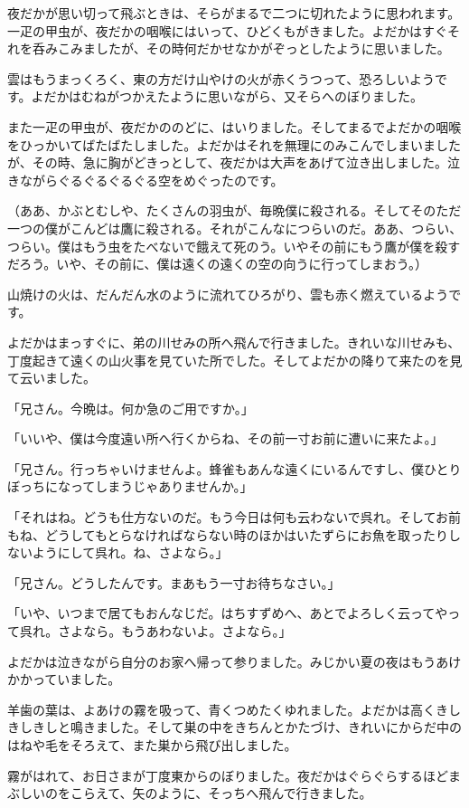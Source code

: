 \documentclass[a4paper, platex, dvipdfmx]{jsarticle}
\begin{document}
夜だかが思い切って飛ぶときは、そらがまるで二つに切れたように思われます。一疋の甲虫が、夜だかの咽喉にはいって、ひどくもがきました。よだかはすぐそれを呑みこみましたが、その時何だかせなかがぞっとしたように思いました。

雲はもうまっくろく、東の方だけ山やけの火が赤くうつって、恐ろしいようです。よだかはむねがつかえたように思いながら、又そらへのぼりました。

また一疋の甲虫が、夜だかののどに、はいりました。そしてまるでよだかの咽喉をひっかいてばたばたしました。よだかはそれを無理にのみこんでしまいましたが、その時、急に胸がどきっとして、夜だかは大声をあげて泣き出しました。泣きながらぐるぐるぐるぐる空をめぐったのです。

（ああ、かぶとむしや、たくさんの羽虫が、毎晩僕に殺される。そしてそのただ一つの僕がこんどは鷹に殺される。それがこんなにつらいのだ。ああ、つらい、つらい。僕はもう虫をたべないで餓えて死のう。いやその前にもう鷹が僕を殺すだろう。いや、その前に、僕は遠くの遠くの空の向うに行ってしまおう。）

山焼けの火は、だんだん水のように流れてひろがり、雲も赤く燃えているようです。

よだかはまっすぐに、弟の川せみの所へ飛んで行きました。きれいな川せみも、丁度起きて遠くの山火事を見ていた所でした。そしてよだかの降りて来たのを見て云いました。

「兄さん。今晩は。何か急のご用ですか。」

「いいや、僕は今度遠い所へ行くからね、その前一寸お前に遭いに来たよ。」

「兄さん。行っちゃいけませんよ。蜂雀もあんな遠くにいるんですし、僕ひとりぼっちになってしまうじゃありませんか。」

「それはね。どうも仕方ないのだ。もう今日は何も云わないで呉れ。そしてお前もね、どうしてもとらなければならない時のほかはいたずらにお魚を取ったりしないようにして呉れ。ね、さよなら。」

「兄さん。どうしたんです。まあもう一寸お待ちなさい。」

「いや、いつまで居てもおんなじだ。はちすずめへ、あとでよろしく云ってやって呉れ。さよなら。もうあわないよ。さよなら。」

よだかは泣きながら自分のお家へ帰って参りました。みじかい夏の夜はもうあけかかっていました。

羊歯の葉は、よあけの霧を吸って、青くつめたくゆれました。よだかは高くきしきしきしと鳴きました。そして巣の中をきちんとかたづけ、きれいにからだ中のはねや毛をそろえて、また巣から飛び出しました。

霧がはれて、お日さまが丁度東からのぼりました。夜だかはぐらぐらするほどまぶしいのをこらえて、矢のように、そっちへ飛んで行きました。
\end{document}
